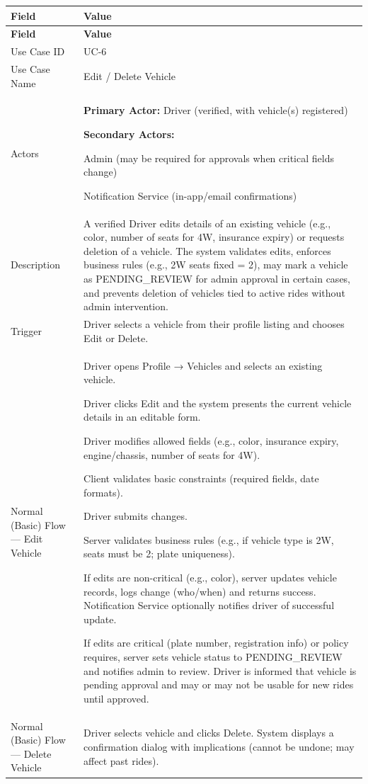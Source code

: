 \begin{longtable}{|p{3.5cm}|p{12cm}|}
\hline
\rowcolor{lightgray!30}
\textbf{Field} & \textbf{Value} \\
\hline
\endfirsthead
\hline
\rowcolor{lightgray!30}
\textbf{Field} & \textbf{Value} \\
\hline
\endhead
\hline
\endfoot
Use Case ID & UC-6 \\
\hline
Use Case Name & Edit / Delete Vehicle \\
\hline
Actors &
\textbf{Primary Actor:} Driver (verified, with vehicle(s) registered)

\textbf{Secondary Actors:}

Admin (may be required for approvals when critical fields change)

Notification Service (in-app/email confirmations) \\
\hline
Description &
A verified Driver edits details of an existing vehicle (e.g., color, number of seats for 4W, insurance expiry) or requests deletion of a vehicle. The system validates edits, enforces business rules (e.g., 2W seats fixed = 2), may mark a vehicle as PENDING\_REVIEW for admin approval in certain cases, and prevents deletion of vehicles tied to active rides without admin intervention. \\
\hline
Trigger &
Driver selects a vehicle from their profile listing and chooses Edit or Delete. \\
\hline
Normal (Basic) Flow — Edit Vehicle &
Driver opens Profile → Vehicles and selects an existing vehicle.

Driver clicks Edit and the system presents the current vehicle details in an editable form.

Driver modifies allowed fields (e.g., color, insurance expiry, engine/chassis, number of seats for 4W).

Client validates basic constraints (required fields, date formats).

Driver submits changes.

Server validates business rules (e.g., if vehicle type is 2W, seats must be 2; plate uniqueness).

If edits are non-critical (e.g., color), server updates vehicle records, logs change (who/when) and returns success. Notification Service optionally notifies driver of successful update.

If edits are critical (plate number, registration info) or policy requires, server sets vehicle status to PENDING\_REVIEW and notifies admin to review. Driver is informed that vehicle is pending approval and may or may not be usable for new rides until approved. \\
\hline
Normal (Basic) Flow — Delete Vehicle &
Driver selects vehicle and clicks Delete. System displays a confirmation dialog with implications (cannot be undone; may affect past rides).


\end{longtable}
